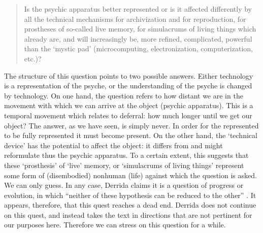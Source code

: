 \begin{quote}
	Is the psychic apparatus better represented or is it affected differently by all the technical mechanisms for archivization and for reproduction, for prostheses of so-called live memory, for simulacrums of living things which already are, and will increasingly be, more refined, complicated, powerful than the `mystic pad' (microcomputing, electronization, computerization, etc.)? \parencite[16]{Der95:Arc} 
\end{quote}


The structure of this question points to two possible answers. Either technology is a representation of the psyche, or the understanding of the psyche is changed by technology. On one hand, the question refers to how distant we are in the movement with which we can arrive at the object (psychic apparatus). This is a temporal movement which relates to deferral: how much longer until we get our object? The answer, as we have seen, is simply never. In order for the represented to be fully represented it must become present. On the other hand, the `technical device' has the potential to affect the object: it differs from and might reformulate thus the psychic apparatus. To a certain extent, this suggests that these `prosthesis' of `live' memory, or `simulacrums of living things' represent some form of (disembodied) nonhuman (life) against which the question is asked. We can only guess. In any case, Derrida claims it is a question of progress or evolution, in which ``neither of these hypothesis can be reduced to the other'' \parencite[16]{Der95:Arc}. It appears, therefore, that this quest reaches a dead end. Derrida does not continue on this quest, and instead takes the text in directions that are not pertinent for our purposes here. Therefore we can stress on this question for a while. 

